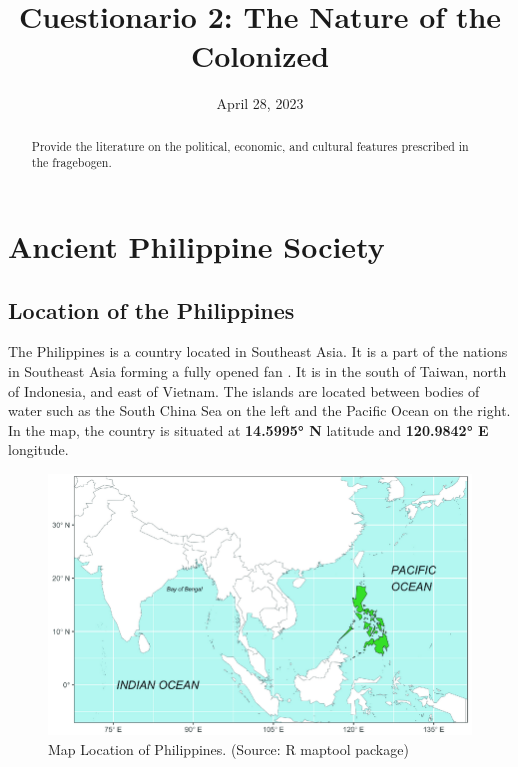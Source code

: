\documentclass[12pt]{article}
\title{Cuestionario 2: The Nature of the Colonized}
\date{April 28, 2023}
\begin{document}
\maketitle

\newpage

\tableofcontents

\newpage

\begin{abstract}
Provide the literature on the political, economic, and cultural features prescribed in the fragebogen. 
\end{abstract}





\section{Ancient Philippine Society}
  \subsection{Location of the Philippines}
  The Philippines is a country located in Southeast Asia. It is a part of the nations in Southeast Asia forming a fully opened fan \citep{corpuz1965philippines}. 
  It is in the south of Taiwan, north of Indonesia, and east of Vietnam. The islands are located between bodies of water such as the South China Sea 
  on the left and the Pacific Ocean on the right. In the map, the country is situated at \textbf{14.5995° N} latitude and \textbf{120.9842° E} longitude.
  \begin{figure}[htbp]
    \centering
    \includegraphics[width=1\textwidth]{images/1_1-philippine_map.png}
    \caption{Map Location of Philippines. (Source: R maptool package)}
    \label{fig:image}
  \end{figure}
\end{document}
